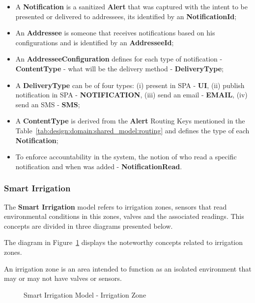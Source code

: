 \begin{itemize}
   \item A \textbf{Notification} is a sanitized \textbf{Alert} that was captured with the intent to be presented or delivered to addressees, its identified by an \textbf{NotificationId};
   \item An \textbf{Addressee} is someone that receives notifications based on his configurations and is identified by an \textbf{AddresseeId};
   \item An \textbf{AddresseeConfiguration} defines for each type of notification - \textbf{ContentType} - what will be the delivery method - \textbf{DeliveryType};
   \item A \textbf{DeliveryType} can be of four types: (i) present in SPA - \textbf{UI}, (ii) publish notification in SPA - \textbf{NOTIFICATION}, (iii) send an email - \textbf{EMAIL}, (iv) send an SMS - \textbf{SMS};
   \item A \textbf{ContentType} is derived from the \textbf{Alert} Routing Keys mentioned in the Table~\ref{tab:design:domain:shared_model:routing} and defines the type of each \textbf{Notification};
   \item To enforce accountability in the system, the notion of who read a specific notification and when was added - \textbf{NotificationRead}.
\end{itemize}

\subsubsection{Smart Irrigation}
\label{subsubsec:design:domain:bounded_contexts:irrigation}

The \textbf{Smart Irrigation} model refers to irrigation zones, sensors that read environmental conditions in this zones, valves and the associated readings. This concepts are divided in three diagrams presented below.

The diagram in Figure~\ref{fig:design:domain:bounded_contexts:irrigation:diagram:garden} displays the noteworthy concepts related to irrigation zones.

An irrigation zone is an area intended to function as an isolated environment that may or may not have valves or sensors.

\begin{figure}[H]
   \centering
  \resizebox{\columnwidth}{!}
  {
     
  }
  \caption[Smart Irrigation Model - Irrigation Zone]{Smart Irrigation Model - Irrigation Zone}
  \label{fig:design:domain:bounded_contexts:irrigation:diagram:garden}
\end{figure}

